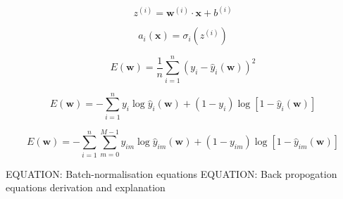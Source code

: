 \begin{equation} %
    z^{(i)}=\boldsymbol{w}^{(i)}\cdot\boldsymbol{x}+b^{(i)}
\end{equation} %

\begin{equation} %
    a_{i}(\boldsymbol{x})=\sigma_i(z^{(i)})
\end{equation} %

\begin{equation} %
    E(\boldsymbol{w})=
    \frac{1}{n}\displaystyle\sum_{i=1}^{n}(y_{i}-
    \hat{y}_{i}(\boldsymbol{w}))^{2}
\end{equation} %

\begin{equation} %
    E(\boldsymbol{w})=
    -\displaystyle\sum_{i=1}^{n}y_{i}\log\hat{y}_{i}(\boldsymbol{w})+
    (1-y_{i})\log[1-\hat{y}_{i}(\boldsymbol{w})]
\end{equation} %

\begin{equation} %
    E(\boldsymbol{w})=
    -\displaystyle\sum_{i=1}^{n}\displaystyle\sum_{m=0}^{M-1}y_{im}\log\hat{y}_{im}
    (\boldsymbol{w})+(1-y_{im})\log[1-\hat{y}_{im}(\boldsymbol{w})]
\end{equation} %

EQUATION: Batch-normalisation equations
EQUATION: Back propogation equations derivation and explanation

